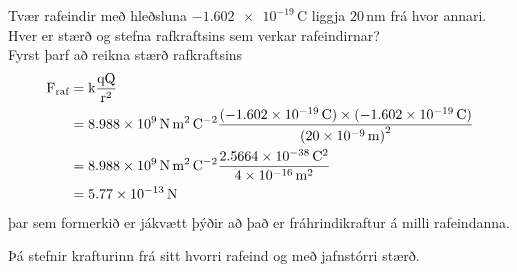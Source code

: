 \begin{formalexample}
	Tvær rafeindir með hleðsluna $\num{-1.602e-19} \, \si{\coulomb}$ liggja
	$\num{20} \, \si{\nano\metre}$ frá hvor annari. Hver er stærð og stefna
	rafkraftsins sem verkar rafeindirnar?
	\\[4 ex]
	Fyrst þarf að reikna stærð rafkraftsins
	\begin{align*}
		\textrm{F}_\text{raf}
		&=
		\text{k} \frac{\textrm{q} \textrm{Q}}{\textrm{r}^2} \\
		&= \num{8.988e9} \, \si{\newton\metre\squared\per\coulomb\squared}
		\frac{(\num{-1.602e-19} \, \si{\coulomb}) 
			\times (\num{-1.602e-19} \, \si{\coulomb})
		}{\left( \num{20e-9} \, \si{\metre} \right)^2} \\
		&= \num{8.988e9} \, \si{\newton\metre\squared\per\coulomb\squared}
		\frac{\num{2.5664e-38} \, \si{\coulomb\squared} 
			}{\num{4e-16} \, \si{\metre\squared}} \\
		&= \num{5.77e-13} \, \si{\newton}
	\end{align*}
	þar sem formerkið er jákvætt þýðir að það er fráhrindikraftur á milli
	rafeindanna.
	\begin{center}
	\end{center}
	Þá stefnir krafturinn frá sitt hvorri rafeind og með jafnstórri stærð.
\end{formalexample}
